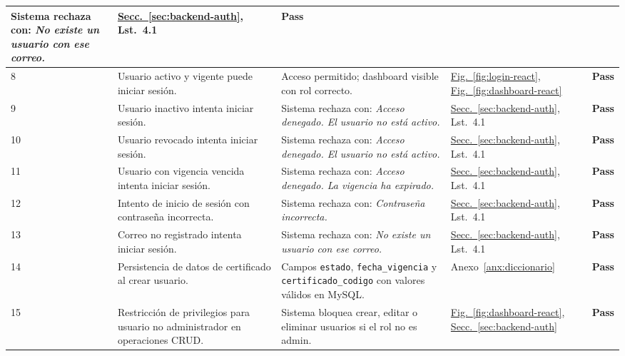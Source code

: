 \documentclass[10pt,letterpaper]{report}
\begin{document}
\begin{longtable}{p{} p{} p{} p{} p{}}
  Sistema rechaza con: \textit{No existe un usuario con ese correo.} &
  \hyperref[sec:backend-auth]{Secc.~\ref*{sec:backend-auth}}, Lst.~4.1 &
  \textcolor{passgreen}{\textbf{Pass}} \\
\midrule
8 & Usuario activo y vigente puede iniciar sesión. &
  Acceso permitido; dashboard visible con rol correcto. &
  \hyperref[fig:login-react]{Fig.~\ref*{fig:login-react}}, \hyperref[fig:dashboard-react]{Fig.~\ref*{fig:dashboard-react}} &
  \textcolor{passgreen}{\textbf{Pass}} \\
\midrule
9 & Usuario inactivo intenta iniciar sesión. &
  Sistema rechaza con: \textit{Acceso denegado. El usuario no está activo.} &
  \hyperref[sec:backend-auth]{Secc.~\ref*{sec:backend-auth}}, Lst.~4.1 &
  \textcolor{passgreen}{\textbf{Pass}} \\
\midrule
10 & Usuario revocado intenta iniciar sesión. &
  Sistema rechaza con: \textit{Acceso denegado. El usuario no está activo.} &
  \hyperref[sec:backend-auth]{Secc.~\ref*{sec:backend-auth}}, Lst.~4.1 &
  \textcolor{passgreen}{\textbf{Pass}} \\
\midrule
11 & Usuario con vigencia vencida intenta iniciar sesión. &
  Sistema rechaza con: \textit{Acceso denegado. La vigencia ha expirado.} &
  \hyperref[sec:backend-auth]{Secc.~\ref*{sec:backend-auth}}, Lst.~4.1 &
  \textcolor{passgreen}{\textbf{Pass}} \\
\midrule
12 & Intento de inicio de sesión con contraseña incorrecta. &
  Sistema rechaza con: \textit{Contraseña incorrecta.} &
  \hyperref[sec:backend-auth]{Secc.~\ref*{sec:backend-auth}}, Lst.~4.1 &
  \textcolor{passgreen}{\textbf{Pass}} \\
\midrule
13 & Correo no registrado intenta iniciar sesión. &
  Sistema rechaza con: \textit{No existe un usuario con ese correo.} &
  \hyperref[sec:backend-auth]{Secc.~\ref*{sec:backend-auth}}, Lst.~4.1 &
  \textcolor{passgreen}{\textbf{Pass}} \\
\midrule
14 & Persistencia de datos de certificado al crear usuario. &
  Campos \texttt{estado}, \texttt{fecha\_vigencia} y \texttt{certificado\_codigo} con valores válidos en MySQL. &
  Anexo~\ref{anx:diccionario} &
  \textcolor{passgreen}{\textbf{Pass}} \\
\midrule
15 & Restricción de privilegios para usuario no administrador en operaciones CRUD. &
  Sistema bloquea crear, editar o eliminar usuarios si el rol no es admin. &
  \hyperref[fig:dashboard-react]{Fig.~\ref*{fig:dashboard-react}}, \hyperref[sec:backend-auth]{Secc.~\ref*{sec:backend-auth}} &
  \textcolor{passgreen}{\textbf{Pass}} \\
\bottomrule
\end{longtable}
\end{document}
